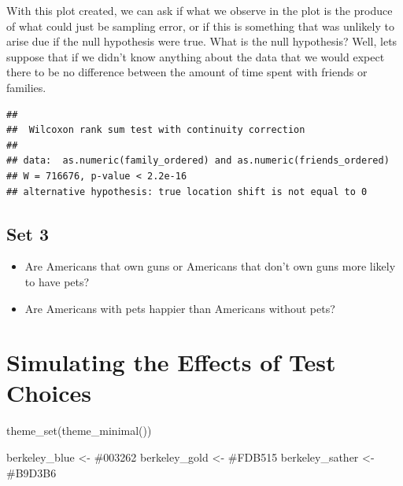 \documentclass[
]{book}
\newenvironment{Shaded}{\begin{snugshade}}{\end{snugshade}}
\newcommand{\AttributeTok}[1]{\textcolor[rgb]{0.77,0.63,0.00}{#1}}
\newcommand{\ConstantTok}[1]{\textcolor[rgb]{0.00,0.00,0.00}{#1}}
\newcommand{\DocumentationTok}[1]{\textcolor[rgb]{0.56,0.35,0.01}{\textbf{\textit{#1}}}}
\newcommand{\FunctionTok}[1]{\textcolor[rgb]{0.00,0.00,0.00}{#1}}
\newcommand{\NormalTok}[1]{#1}
\newcommand{\OtherTok}[1]{\textcolor[rgb]{0.56,0.35,0.01}{#1}}
\newcommand{\SpecialCharTok}[1]{\textcolor[rgb]{0.00,0.00,0.00}{#1}}
\newcommand{\StringTok}[1]{\textcolor[rgb]{0.31,0.60,0.02}{#1}}
\providecommand{\tightlist}{%
  \setlength{\itemsep}{0pt}\setlength{\parskip}{0pt}}
\theoremstyle{definition}
\theoremstyle{definition}
\theoremstyle{definition}
\theoremstyle{definition}
\theoremstyle{remark}
\begin{document}
With this plot created, we can ask if what we observe in the plot is the produce of what could just be sampling error, or if this is something that was unlikely to arise due if the null hypothesis were true. What is the null hypothesis? Well, lets suppose that if we didn't know anything about the data that we would expect there to be no difference between the amount of time spent with friends or families.

\begin{Shaded}
\end{Shaded}

\begin{verbatim}
## 
##  Wilcoxon rank sum test with continuity correction
## 
## data:  as.numeric(family_ordered) and as.numeric(friends_ordered)
## W = 716676, p-value < 2.2e-16
## alternative hypothesis: true location shift is not equal to 0
\end{verbatim}

\hypertarget{set-3}{%
\subsection{Set 3}\label{set-3}}

\begin{itemize}
\tightlist
\item
  Are Americans that own guns or Americans that don't own guns more likely to have pets?
\item
  Are Americans with pets happier than Americans without pets?
\end{itemize}

\hypertarget{simulating-the-effects-of-test-choices}{%
\section{Simulating the Effects of Test Choices}\label{simulating-the-effects-of-test-choices}}

\begin{Shaded}
\begin{Highlighting}[]
\FunctionTok{theme\_set}\NormalTok{(}\FunctionTok{theme\_minimal}\NormalTok{())}

\NormalTok{berkeley\_blue   }\OtherTok{\textless{}{-}} \StringTok{\textquotesingle{}\#003262\textquotesingle{}}
\NormalTok{berkeley\_gold   }\OtherTok{\textless{}{-}} \StringTok{\textquotesingle{}\#FDB515\textquotesingle{}}
\NormalTok{berkeley\_sather }\OtherTok{\textless{}{-}} \StringTok{\textquotesingle{}\#B9D3B6\textquotesingle{}}
\end{Highlighting}
\end{Shaded}
\end{document}
